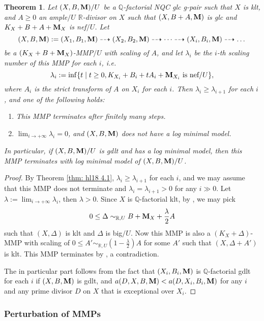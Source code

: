 \documentclass[11pt]{amsart}
\numberwithin{equation}{section}
\newcommand{\Mm}{{\bf{M}}}
\newcommand{\Qq}{\mathbb{Q}}
\newcommand{\Rr}{\mathbb{R}}
\newtheorem{thm}{Theorem}[section]
\theoremstyle{definition}
\theoremstyle{definition}
\theoremstyle{definition}
\begin{document}
\begin{thm}\label{thm: mmp with scaling gpair terminates assuming gmm}
Let $(X,B,\Mm)/U$ be a $\Qq$-factorial NQC glc g-pair such that $X$ is klt, and $A\geq 0$ an ample$/U$ $\Rr$-divisor on $X$ such that $(X,B+A,\Mm)$ is glc and $K_X+B+A+\Mm_X$ is nef$/U$. Let $$(X,B,\Mm):=(X_1,B_1,\Mm)\dashrightarrow (X_2,B_2,\Mm)\dashrightarrow\dots\dashrightarrow (X_i,B_i,\Mm)\dashrightarrow\dots$$
be a $(K_X+B+\Mm_X)$-MMP$/U$ with scaling of $A$, and let $\lambda_i$ be the $i$-th scaling number of this MMP for each $i$, i.e.
$$\lambda_i:=\inf\{t\mid t\geq 0, K_{X_i}+B_i+tA_i+\Mm_{X_i}\text{ is nef/}U\},$$
where $A_i$ is the strict transform of $A$ on $X_i$ for each $i$. Then $\lambda_i\geq\lambda_{i+1}$ for each $i$, and one of the following holds:
\begin{enumerate}
    \item This MMP terminates after finitely many steps.
    \item $\lim_{i\rightarrow +\infty}\lambda_i=0$, and $(X,B,\Mm)$ does not have a log minimal model.
\end{enumerate}
In particular, if $(X,B,\Mm)/U$ is gdlt and has a log minimal model, then this MMP terminates with log minimal model of $(X,B,\Mm)/U$.
\end{thm}
\begin{proof}
By Theorem \ref{thm: hl18 4.1},  $\lambda_i\geq\lambda_{i+1}$ for each $i$, and we may assume that this MMP does not terminate and $\lambda_i=\lambda_{i+1}>0$ for any $i\gg 0$. Let $\lambda:=\lim_{i\rightarrow+\infty}\lambda_i$, then $\lambda>0$. Since $X$ is $\Qq$-factorial klt, by \cite[Lemma 3.5]{HL18}, we may pick 
$$0\leq \Delta\sim_{\mathbb R,U}B+\Mm_X+\frac{\lambda}{2}A$$ 
such that $(X,\Delta)$ is klt and $\Delta$ is big$/U$. Now this MMP is also a $(K_X+\Delta)$-MMP with scaling of $0\leq A'\sim_{\mathbb R,U}(1-\frac{\lambda}{2})A$ for some $A'$ such that $(X,\Delta+A')$ is klt. This MMP terminates by \cite[Corollary 1.4.2]{BCHM10}, a contradiction.

The in particular part follows from the fact that $(X_i,B_i,\Mm)$ is $\Qq$-factorial gdlt for each $i$ if $(X,B,\Mm)$ is gdlt, and $a(D,X,B,\Mm)<a(D,X_i,B_i,\Mm)$ for any $i$ and any prime divisor $D$ on $X$ that is exceptional over $X_i$.
\end{proof}




\subsubsection{Perturbation of MMPs}
\end{document}
